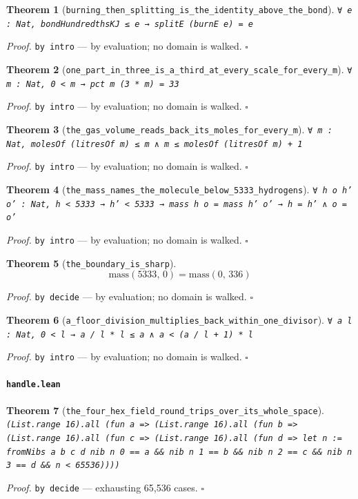 \documentclass[11pt]{article}
\newtheorem{theorem}{Theorem}[section]
\begin{document}
\begin{theorem}[\texttt{burning\_then\_splitting\_is\_the\_identity\_above\_the\_bond}]
\texttt{∀ e : Nat, bondHundredthsKJ ≤ e → splitE (burnE e) = e}
\end{theorem}
\noindent\emph{Proof.} \texttt{by
  intro} --- by evaluation; no domain is walked. \hfill$\square$

\begin{theorem}[\texttt{one\_part\_in\_three\_is\_a\_third\_at\_every\_scale\_for\_every\_m}]
\texttt{∀ m : Nat, 0 < m → pct m (3 * m) = 33}
\end{theorem}
\noindent\emph{Proof.} \texttt{by
  intro} --- by evaluation; no domain is walked. \hfill$\square$

\begin{theorem}[\texttt{the\_gas\_volume\_reads\_back\_its\_moles\_for\_every\_m}]
\texttt{∀ m : Nat, molesOf (litresOf m) ≤ m ∧ m ≤ molesOf (litresOf m) + 1}
\end{theorem}
\noindent\emph{Proof.} \texttt{by
  intro} --- by evaluation; no domain is walked. \hfill$\square$

\begin{theorem}[\texttt{the\_mass\_names\_the\_molecule\_below\_5333\_hydrogens}]
\texttt{∀ h o h' o' : Nat, h < 5333 → h' < 5333 → mass h o = mass h' o' → h = h' ∧ o = o'}
\end{theorem}
\noindent\emph{Proof.} \texttt{by
  intro} --- by evaluation; no domain is walked. \hfill$\square$

\begin{theorem}[\texttt{the\_boundary\_is\_sharp}]
\[ \mathrm{mass}\mathopen{}\left(5333,\,0\right) = \mathrm{mass}\mathopen{}\left(0,\,336\right) \]
\end{theorem}
\noindent\emph{Proof.} \texttt{by decide} --- by evaluation; no domain is walked. \hfill$\square$

\begin{theorem}[\texttt{a\_floor\_division\_multiplies\_back\_within\_one\_divisor}]
\texttt{∀ a l : Nat, 0 < l → a / l * l ≤ a ∧ a < (a / l + 1) * l}
\end{theorem}
\noindent\emph{Proof.} \texttt{by
  intro} --- by evaluation; no domain is walked. \hfill$\square$

\paragraph{\texttt{handle.lean}}

\begin{theorem}[\texttt{the\_four\_hex\_field\_round\_trips\_over\_its\_whole\_space}]
\texttt{(List.range 16).all (fun a => (List.range 16).all (fun b => (List.range 16).all (fun c => (List.range 16).all (fun d => let n := fromNibs a b c d nib n 0 == a \&\& nib n 1 == b \&\& nib n 2 == c \&\& nib n 3 == d \&\& n < 65536))))}
\end{theorem}
\noindent\emph{Proof.} \texttt{by decide} --- exhausting 65,536 cases. \hfill$\square$
\end{document}
